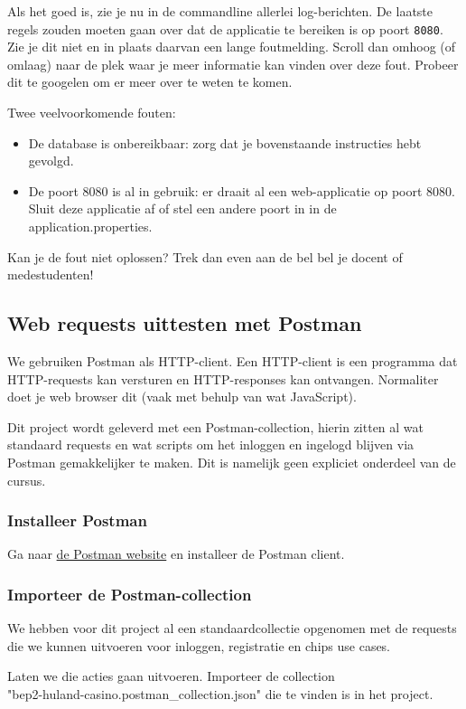 Als het goed is, zie je nu in de commandline allerlei log-berichten. De laatste regels 
zouden moeten gaan over dat de applicatie te bereiken is op poort \texttt{8080}.
Zie je dit niet en in plaats daarvan een lange foutmelding. Scroll dan omhoog (of omlaag)
naar de plek waar je meer informatie kan vinden over deze fout. Probeer dit te googelen 
om er meer over te weten te komen. 

Twee veelvoorkomende fouten:
\begin{itemize}
    \item De database is onbereikbaar: zorg dat je bovenstaande instructies hebt gevolgd.
    \item De poort 8080 is al in gebruik: er draait al een web-applicatie op poort 8080. 
    Sluit deze applicatie af of stel een andere poort in in de application.properties.
\end{itemize}

Kan je de fout niet oplossen? Trek dan even aan de bel bel je docent of medestudenten!

\subsection{Web requests uittesten met Postman}
We gebruiken Postman als HTTP-client. Een HTTP-client is een programma dat 
HTTP-requests kan versturen en HTTP-responses kan ontvangen.
Normaliter doet je web browser dit (vaak met behulp van wat JavaScript).

Dit project wordt geleverd met een Postman-collection,
hierin zitten al wat standaard requests en wat scripts om het inloggen
en ingelogd blijven via Postman gemakkelijker te maken. Dit is namelijk 
geen expliciet onderdeel van de cursus.

\subsubsection{Installeer Postman}
Ga naar \href{https://www.postman.com/downloads/}{de Postman website} 
en installeer de Postman client.

\subsubsection{Importeer de Postman-collection}
We hebben voor dit project al een standaardcollectie opgenomen met 
de requests die we kunnen uitvoeren voor inloggen, registratie en 
chips use cases.

Laten we die acties gaan uitvoeren. Importeer de collection
\\ "bep2-huland-casino.postman\_collection.json" die te 
vinden is in het project.

